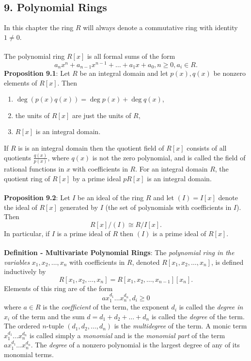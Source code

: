 \documentclass{article}
\begin{document}
\subsection*{9. Polynomial Rings}
In this chapter the ring $R$ will always denote a commutative ring with identity $1 \neq 0$. \\ \\
The polynomial ring $R[x]$ is all formal sums of the form $$a_nx^n + a_{n - 1}x^{n - 1} + \dots + a_1x + a_0, n \geq 0, a_i \in R.$$
\textbf{Proposition 9.1}: Let $R$ be an integral domain and let $p(x), q(x)$ be nonzero elements of $R[x]$. Then \begin{enumerate}
    \item $\deg(p(x)q(x)) = \deg p(x) + \deg q(x)$,
    \item the units of $R[x]$ are just the units of $R$,
    \item $R[x]$ is an integral domain.
\end{enumerate} $ $ \\
If $R$ is is an integral domain then the quotient field of $R[x]$ consists of all quotients $\frac{q(x)}{p(x)}$, where $q(x)$ is not the zero polynomial, and is called the field of rational functions in $x$ with coefficients in $R$. For an integral domain $R$, the quotient ring of $R[x]$ by a prime ideal $pR[x]$ is an integral domain. \\ \\
\textbf{Proposition 9.2}: Let $I$ be an ideal of the ring $R$ and let $(I) = I[x]$ denote the ideal of $R[x]$ generated by $I$ (the set of polynomials with coefficients in $I$). Then $$R[x]/(I) \cong R/I[x].$$ In particular, if $I$ is a prime ideal of $R$ then $(I)$ is a prime ideal of $R[x]$. \\ \\
\textbf{Definition - Multivariate Polynomial Rings}: The \textit{polynomial ring in the variables} $x_1, x_2, \dots, x_n$ with coefficients in $R$, denoted $R[x_1, x_2, \dots, x_n]$, is defined inductively by $$R[x_1, x_2, \dots, x_n] = R[x_1, x_2, \dots, x_{n - 1}][x_n].$$ Elements of this ring are of the form $$ax_1^{d_1} \dots x_n^{d_n}, d_i \geq 0$$ where $a \in R$ is the \textit{coefficient} of the term, the exponent $d_i$ is called the \textit{degree in} $x_i$ of the term and the sum $d = d_1 + d_2 + \dots + d_n$ is called the \textit{degree} of the term. The ordered $n$-tuple $(d_1, d_2, \dots, d_n)$ is the \textit{multidegree} of the term. A monic term $x_1^{d_1} \dots x_n^{d_n}$ is called simply a \textit{monomial} and is the \textit{monomial part} of the term $ax_1^{d_1} \dots x_n^{d_n}$. The \textit{degree} of a nonzero polynomial is the largest degree of any of its monomial terms. \\
\end{document}
